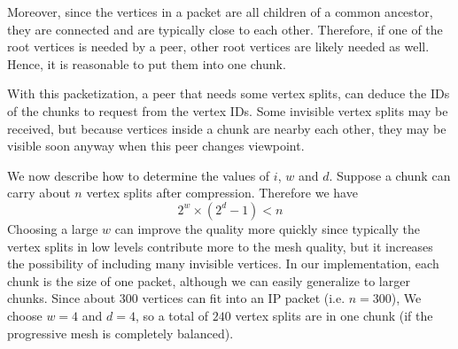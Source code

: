     Moreover, since the vertices in a packet are all children of a
    common ancestor, they are connected and are typically close to
    each other. Therefore, if one of the root vertices is needed by a
    peer, other root vertices are likely needed as well. Hence,
    it is reasonable to put them into one chunk.
    
    With this packetization, a peer that needs some vertex splits,
    can deduce the IDs of the chunks to
    request from the vertex IDs. Some invisible vertex splits may be received, but 
    because vertices inside a chunk are nearby each other, 
    they may be visible soon anyway when this peer changes viewpoint. 
    
    We now describe how to determine the values of $i$, $w$ and $d$.
    Suppose a chunk can carry about $n$ vertex splits after compression. 
    Therefore we have  
    \begin{displaymath}
    2^{w} \times (2^{d} - 1) < n 
    \end{displaymath}
    Choosing a large $w$ can improve the quality more quickly since 
    typically the vertex splits in low levels contribute more
    to the mesh quality,
    but it increases the possibility of including many invisible
    vertices.
    In our implementation, each chunk is the size of one packet, although we can easily generalize to larger chunks.
    Since about 300 vertices can fit into an IP packet 
    (i.e. $n=300$),
    We choose $w=4$ and $d=4$, so a total of $240$ vertex splits are 
    in one chunk (if the progressive mesh is completely balanced).

